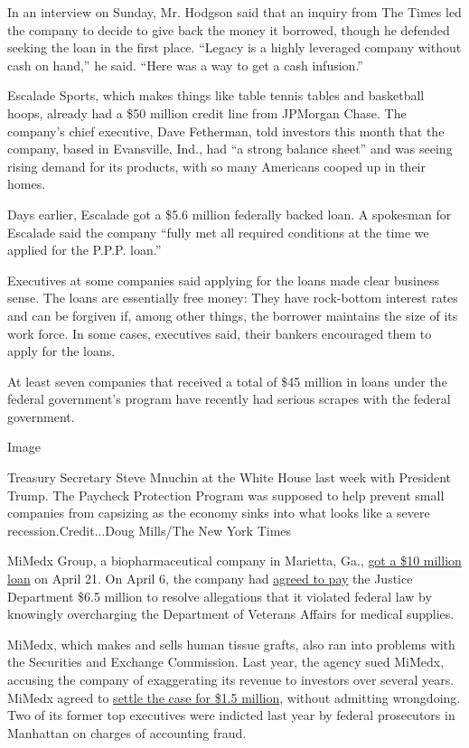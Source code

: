 In an interview on Sunday, Mr. Hodgson said that an inquiry from The
Times led the company to decide to give back the money it borrowed,
though he defended seeking the loan in the first place. ``Legacy is a
highly leveraged company without cash on hand,'' he said. ``Here was a
way to get a cash infusion.''

Escalade Sports, which makes things like table tennis tables and
basketball hoops, already had a \$50 million credit line from JPMorgan
Chase. The company's chief executive, Dave Fetherman, told investors
this month that the company, based in Evansville, Ind., had ``a strong
balance sheet'' and was seeing rising demand for its products, with so
many Americans cooped up in their homes.

Days earlier, Escalade got a \$5.6 million federally backed loan. A
spokesman for Escalade said the company ``fully met all required
conditions at the time we applied for the P.P.P. loan.''

Executives at some companies said applying for the loans made clear
business sense. The loans are essentially free money: They have
rock-bottom interest rates and can be forgiven if, among other things,
the borrower maintains the size of its work force. In some cases,
executives said, their bankers encouraged them to apply for the loans.

At least seven companies that received a total of \$45 million in loans
under the federal government's program have recently had serious scrapes
with the federal government.

Image

Treasury Secretary Steve Mnuchin at the White House last week with
President Trump. The Paycheck Protection Program was supposed to help
prevent small companies from capsizing as the economy sinks into what
looks like a severe recession.Credit...Doug Mills/The New York Times

MiMedx Group, a biopharmaceutical company in Marietta, Ga.,
\href{https://mimedx.gcs-web.com/news-releases/news-release-details/mimedx-announces-additional-access-capital-and-financing}{got
a \$10 million loan} on April 21. On April 6, the company had
\href{https://www.justice.gov/opa/pr/mimedx-group-inc-agrees-pay-65-million-resolve-false-claims-act-allegations-false-commercial}{agreed
to pay} the Justice Department \$6.5 million to resolve allegations that
it violated federal law by knowingly overcharging the Department of
Veterans Affairs for medical supplies.

MiMedx, which makes and sells human tissue grafts, also ran into
problems with the Securities and Exchange Commission. Last year, the
agency sued MiMedx, accusing the company of exaggerating its revenue to
investors over several years. MiMedx agreed to
\href{https://mimedx.gcs-web.com/news-releases/news-release-details/mimedx-announces-securities-and-exchange-commission-settlement}{settle
the case for \$1.5 million}, without admitting wrongdoing. Two of its
former top executives were indicted last year by federal prosecutors in
Manhattan on charges of accounting fraud.

